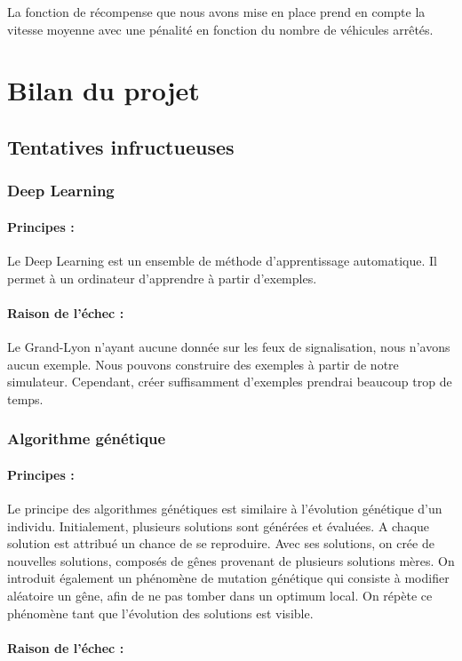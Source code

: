 \documentclass[11pt]{article}
\begin{document}
La fonction de récompense que nous avons mise en place prend en compte la vitesse moyenne avec une pénalité en fonction du nombre de véhicules arrêtés. 

\section{Bilan du projet}
\subsection{Tentatives infructueuses}
\subsubsection{Deep Learning}
\paragraph{Principes :}{
Le Deep Learning est un ensemble de méthode d'apprentissage automatique. Il permet à un ordinateur d'apprendre à partir d'exemples.
}
\paragraph{Raison de l'échec :}{
Le Grand-Lyon n'ayant aucune donnée sur les feux de signalisation, nous n'avons aucun exemple. Nous pouvons construire des exemples à partir de notre simulateur. Cependant, créer suffisamment d'exemples prendrai beaucoup trop de temps. 
}

\subsubsection{Algorithme génétique}
\paragraph{Principes :}{
Le principe des algorithmes génétiques est similaire à l'évolution génétique d'un individu. Initialement, plusieurs solutions sont générées et évaluées. A chaque solution est attribué un chance de se reproduire. Avec ses solutions, on crée de nouvelles solutions, composés de gênes provenant de plusieurs solutions mères. On introduit également un phénomène de mutation génétique qui consiste à modifier aléatoire un gêne, afin de ne pas tomber dans un optimum local.
On répète ce phénomène tant que l'évolution des solutions est visible. 
}
\paragraph{Raison de l'échec :}{

}

\end{document}
